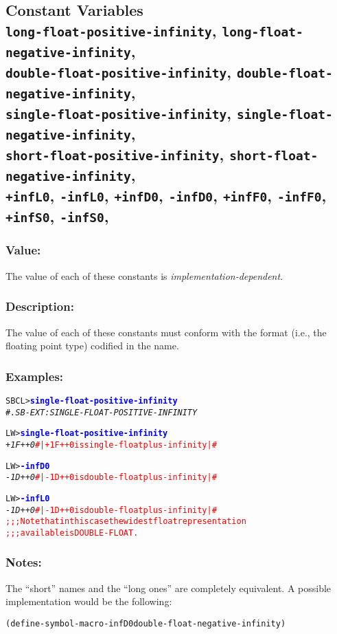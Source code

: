 \documentclass[10pt,fleqn]{article}
\newcommand{\code}[1]{\texttt{#1}}
\newcommand{\codeprompt}[1]{\textcolor{blue}{\textbf{#1}}}
\newcommand{\DDictionaryItem}[1]{\vspace*{6pt}\noindent\hrulefill\vspace*{-9pt}\subsection*{#1}}
\newcommand{\DDescription}{\subsubsection*{Description:}}
\newcommand{\DExamples}{\subsubsection*{Examples:}}
\newcommand{\DNotes}{\subsubsection*{Notes:}}
\begin{document}
\DDictionaryItem{Constant Variables\\
  \code{long-float-positive-infinity},
  \code{long-float-negative-infinity},\\
  \code{double-float-positive-infinity},
  \code{double-float-negative-infinity},\\
  \code{single-float-positive-infinity},
  \code{single-float-negative-infinity},\\
  \code{short-float-positive-infinity},
  \code{short-float-negative-infinity},\\
  \code{+infL0}, 
  \code{-infL0},
  \code{+infD0}, 
  \code{-infD0},
  \code{+infF0}, 
  \code{-infF0},
  \code{+infS0}, 
  \code{-infS0},
  }

\subsubsection*{Value:}

The value of each of these constants is
\emph{implementation-dependent}.


\DDescription{}

The value of each of these constants must conform with the format
(i.e., the floating point type) codified in the name.


\DExamples{}

\begin{alltt}
SBCL> \codeprompt{single-float-positive-infinity}
\textit{#.SB-EXT:SINGLE-FLOAT-POSITIVE-INFINITY}
\end{alltt}

\begin{alltt}
LW> \codeprompt{single-float-positive-infinity}
\textit{+1F++0} \textcolor{red}{#| +1F++0 is single-float plus-infinity |#}
\end{alltt}

\begin{alltt}
LW> \codeprompt{-infD0}
\textit{-1D++0} \textcolor{red}{#| -1D++0 is double-float plus-infinity |#}
\end{alltt}

\begin{alltt}
LW> \codeprompt{-infL0}
\textit{-1D++0} \textcolor{red}{#| -1D++0 is double-float plus-infinity |#}
\textcolor{red}{;;; Note that in this case the widest float representation
;;; available is DOUBLE-FLOAT.}
\end{alltt}


\DNotes{}

The ``short'' names and the ``long ones'' are completely equivalent.
A possible implementation would be the following:
\begin{alltt}
(define-symbol-macro -infD0 double-float-negative-infinity)
\end{alltt}
\end{document}

